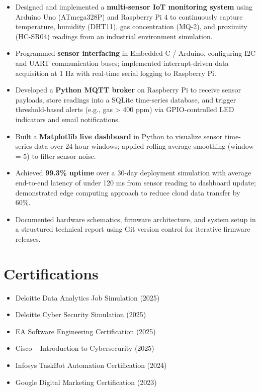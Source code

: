 \documentclass[11pt,a4paper]{article}
\begin{document}
\begin{itemize}
  \item Designed and implemented a \textbf{multi-sensor IoT monitoring system} using Arduino Uno (ATmega328P)
        and Raspberry Pi 4 to continuously capture temperature, humidity (DHT11), gas concentration (MQ-2),
        and proximity (HC-SR04) readings from an industrial environment simulation.
  \item Programmed \textbf{sensor interfacing} in Embedded C / Arduino, configuring I2C and UART communication
        buses; implemented interrupt-driven data acquisition at 1 Hz with real-time serial logging to Raspberry Pi.
  \item Developed a \textbf{Python MQTT broker} on Raspberry Pi to receive sensor payloads, store readings into
        a SQLite time-series database, and trigger threshold-based alerts (e.g., gas > 400 ppm) via GPIO-controlled
        LED indicators and email notifications.
  \item Built a \textbf{Matplotlib live dashboard} in Python to visualize sensor time-series data over 24-hour
        windows; applied rolling-average smoothing (window = 5) to filter sensor noise.
  \item Achieved \textbf{99.3\% uptime} over a 30-day deployment simulation with average end-to-end latency of
        under 120 ms from sensor reading to dashboard update; demonstrated edge computing approach to reduce
        cloud data transfer by 60\%.
  \item Documented hardware schematics, firmware architecture, and system setup in a structured technical
        report using Git version control for iterative firmware releases.
\end{itemize}

\section{Certifications}

\begin{itemize}
  \item Deloitte Data Analytics Job Simulation (2025)
  \item Deloitte Cyber Security Simulation (2025)
  \item EA Software Engineering Certification (2025)
  \item Cisco -- Introduction to Cybersecurity (2025)
  \item Infosys TaskBot Automation Certification (2024)
  \item Google Digital Marketing Certification (2023)
\end{itemize}
\end{document}
